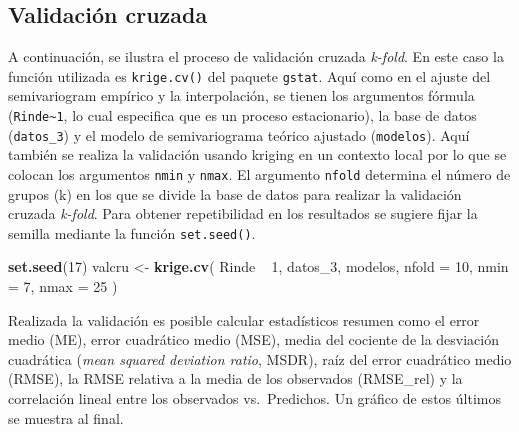 \documentclass[11pt,b5paper,]{krantz}
\newenvironment{Shaded}{}{}
\newcommand{\DataTypeTok}[1]{\textcolor[rgb]{0.56,0.13,0.00}{#1}}
\newcommand{\DecValTok}[1]{\textcolor[rgb]{0.25,0.63,0.44}{#1}}
\newcommand{\KeywordTok}[1]{\textcolor[rgb]{0.00,0.44,0.13}{\textbf{#1}}}
\newcommand{\NormalTok}[1]{#1}
\newcommand{\OperatorTok}[1]{\textcolor[rgb]{0.40,0.40,0.40}{#1}}
\newcommand{\StringTok}[1]{\textcolor[rgb]{0.25,0.44,0.63}{#1}}
\begin{document}
\hypertarget{validaciuxf3n-cruzada-1}{%
\subsection{Validación cruzada}\label{validaciuxf3n-cruzada-1}}

A continuación, se ilustra el proceso de validación cruzada \emph{k-fold}. En este caso la función utilizada es \texttt{krige.cv()} del paquete \texttt{gstat}. Aquí como en el ajuste del semivariogram empírico y la interpolación, se tienen los argumentos fórmula (\texttt{Rinde\textasciitilde{}1}, lo cual especifica que es un proceso estacionario), la base de datos (\texttt{datos\_3}) y el modelo de semivariograma teórico ajustado (\texttt{modelos}). Aquí también se realiza la validación usando kriging en un contexto local por lo que se colocan los argumentos \texttt{nmin} y \texttt{nmax}. El argumento \texttt{nfold} determina el número de grupos (k) en los que se divide la base de datos para realizar la validación cruzada \emph{k-fold}. Para obtener repetibilidad en los resultados se sugiere fijar la semilla mediante la función \texttt{set.seed()}.

\begin{Shaded}
\begin{Highlighting}[]
\KeywordTok{set.seed}\NormalTok{(}\DecValTok{17}\NormalTok{)}
\NormalTok{valcru <-}
\StringTok{  }\KeywordTok{krige.cv}\NormalTok{(}
\NormalTok{    Rinde }\OperatorTok{~}\StringTok{ }\DecValTok{1}\NormalTok{,}
\NormalTok{    datos_}\DecValTok{3}\NormalTok{,}
\NormalTok{    modelos,}
    \DataTypeTok{nfold =} \DecValTok{10}\NormalTok{,}
    \DataTypeTok{nmin =} \DecValTok{7}\NormalTok{,}
    \DataTypeTok{nmax =} \DecValTok{25}
\NormalTok{  )}
\end{Highlighting}
\end{Shaded}

Realizada la validación es posible calcular estadísticos resumen como el error medio (ME), error cuadrático medio (MSE), media del cociente de la desviación cuadrática (\emph{mean squared deviation ratio}, MSDR), raíz del error cuadrático medio (RMSE), la RMSE relativa a la media de los observados (RMSE\_rel) y la correlación lineal entre los observados vs.~Predichos. Un gráfico de estos últimos se muestra al final.
\end{document}
